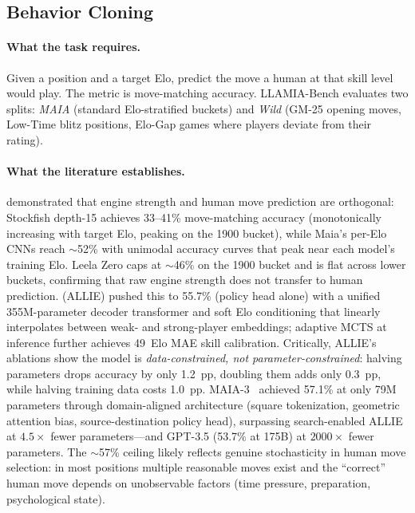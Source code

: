 \subsection{Behavior Cloning}
\label{sec:app_landscape_bc}

\paragraph{What the task requires.}
Given a position and a target Elo, predict the move a human at that skill
level would play.
The metric is move-matching accuracy.
LLAMIA-Bench evaluates two splits: \emph{MAIA} (standard Elo-stratified
buckets) and \emph{Wild} (GM-25 opening moves, Low-Time blitz positions,
Elo-Gap games where players deviate from their rating).

\paragraph{What the literature establishes.}
\citet{mcilroy2022aligning} demonstrated that engine strength and human move
prediction are orthogonal: Stockfish depth-15 achieves 33--41\% move-matching
accuracy (monotonically increasing with target Elo, peaking on the 1900
bucket), while Maia's per-Elo CNNs reach ${\sim}$52\% with unimodal accuracy
curves that peak near each model's training Elo.
Leela Zero caps at ${\sim}$46\% on the 1900 bucket and is flat across lower
buckets, confirming that raw engine strength does not transfer to human
prediction.
\citet{zhang2024humanalignedchessbitsearch} (ALLIE) pushed this to 55.7\%
(policy head alone) with a unified 355M-parameter decoder transformer and
soft Elo conditioning that linearly interpolates between weak- and
strong-player embeddings; adaptive MCTS at inference further achieves
49~Elo MAE skill calibration.
Critically, ALLIE's ablations show the model is \emph{data-constrained, not
parameter-constrained}: halving parameters drops accuracy by only 1.2~pp,
doubling them adds only 0.3~pp, while halving training data costs 1.0~pp.
MAIA-3~\cite{XXX_chessformer} achieved 57.1\% at only 79M parameters through
domain-aligned architecture (square tokenization, geometric attention bias,
source-destination policy head), surpassing search-enabled ALLIE at
$4.5{\times}$ fewer parameters---and GPT-3.5 (53.7\% at 175B) at
$2000{\times}$ fewer parameters.
The ${\sim}$57\% ceiling likely reflects genuine stochasticity in human move
selection: in most positions multiple reasonable moves exist and the
``correct'' human move depends on unobservable factors (time pressure,
preparation, psychological state).


